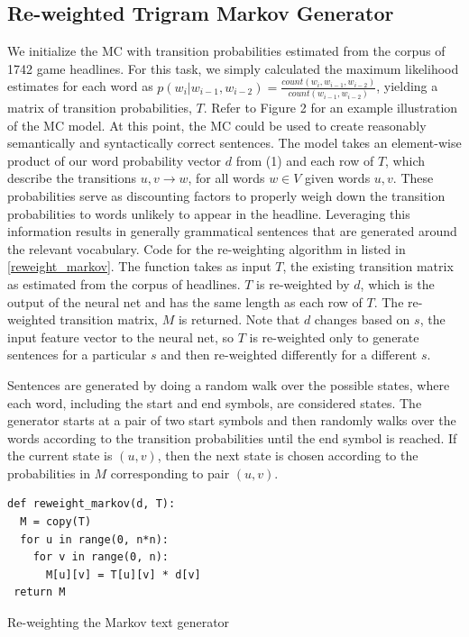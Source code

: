 \documentclass[12pt, journal]{IEEEtran}
\begin{document}
\subsection{Re-weighted Trigram Markov Generator}
We initialize the MC with transition probabilities estimated from the corpus of 1742 game headlines. For this task, we simply calculated the maximum likelihood estimates for each word as $p(w_i|w_{i-1},w_{i-2}) = \frac{count(w_i, w_{i-1}, w_{i-2})}{count(w_{i-1},w_{i-2})}$, yielding a matrix of transition probabilities, $T$. Refer to Figure 2 for an example illustration of the MC model. At this point, the MC could be used to create reasonably semantically and syntactically correct sentences. The model takes an element-wise product of our word probability vector $d$ from (1) and each row of $T$, which describe the transitions $u, v \rightarrow w$, for all words $w \in V$ given words $u, v$. These probabilities serve as discounting factors to properly weigh down the transition probabilities to words unlikely to appear in the headline. Leveraging this information results in generally grammatical sentences that are generated around the relevant vocabulary. Code for the re-weighting algorithm in listed in \ref{reweight_markov}. The function takes as input $T$, the existing transition matrix as estimated from the corpus of headlines. $T$ is re-weighted by $d$, which is the output of the neural net and has the same length as each row of $T$. The re-weighted transition matrix, $M$ is returned. Note that $d$ changes based on $s$, the input feature vector to the neural net, so $T$ is re-weighted only to generate sentences for a particular $s$ and then re-weighted differently for a different $s$.

Sentences are generated by doing a random walk over the possible states, where each word, including the start and end symbols, are considered states. The generator starts at a pair of two start symbols and then randomly walks over the words according to the transition probabilities until the end symbol is reached. If the current state is $(u,v)$, then the next state is chosen according to the probabilities in $M$ corresponding to pair $(u,v)$.

\begin{listing}[H]
\begin{verbatim}
def reweight_markov(d, T):
  M = copy(T)
  for u in range(0, n*n):
    for v in range(0, n):
      M[u][v] = T[u][v] * d[v]
 return M
\end{verbatim}
\caption{Re-weighting the Markov text generator}
\label{reweight_markov}
\end{listing}
\end{document}

